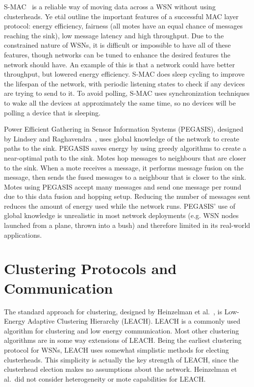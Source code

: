 S-MAC~\cite{smac} is a reliable way of moving data across a WSN without using clusterheads.
Ye et\. al outline the important features of a successful MAC layer protocol: energy efficiency, 
fairness (all motes have an equal chance of messages reaching the sink), low message latency and high throughput. 
Due to the constrained nature of WSNs, it is difficult or impossible to have all of these features, though 
networks can be tuned to enhance the desired features the network should have. An example of this 
is that a network could have better throughput, but lowered energy efficiency. S-MAC does sleep
cycling to improve the lifespan of the network, with periodic listening states to check
if any devices are trying to send to it. To avoid polling, S-MAC uses synchronization 
techniques to wake all the devices at approximately the same time, so no devices will be polling 
a device that is sleeping.




Power Efficient Gathering in Sensor Information Systems (PEGASIS), designed by Lindsey and Raghavendra~\cite{pegasis},
uses global knowledge of the network to create
paths to the sink. PEGASIS saves energy by using greedy algorithms 
to create a near-optimal path to the sink. Motes hop
messages to neighbours that are closer to the sink. When a mote
receives a message, it performs message fusion on the message, then sends
the fused messages to a neighbour that is closer to the sink. Motes
using PEGASIS accept many messages and send one message per round due to this data fusion and 
hopping setup. Reducing the number of messages sent reduces the amount of energy used 
while the network runs.
PEGASIS' use of global knowledge is unrealistic in most network deployments (e.g. WSN nodes launched from a plane,
thrown into a bush) and therefore limited in its real-world applications.


\section{Clustering Protocols and Communication}

The standard approach for clustering, designed by Heinzelman et 
al.~\cite{leach}, is Low-Energy Adaptive Clustering Hierarchy (LEACH). LEACH 
is a commonly used algorithm for clustering and low energy communication. Most 
other clustering algorithms are in some way extensions of LEACH.  
Being the earliest clustering protocol for WSNs, LEACH uses somewhat 
simplistic methods for electing clusterheads. This simplicity is actually the key strength 
of LEACH, since the clusterhead election makes no assumptions about the 
network.  Heinzelman et al.\ did not consider heterogeneity or mote 
capabilities for LEACH.

